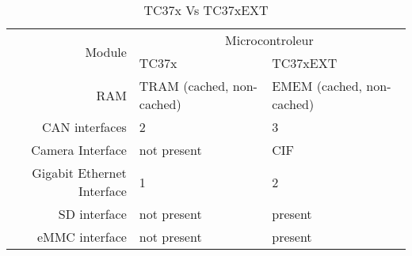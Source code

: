 
\begin{table}[htbp]
  \centering
    \begin{tabular}{|r||l|l|}
	\hline
	\multirow{2}{*}{Module} & \multicolumn{2}{c|}{Microcontroleur}\\
	\cline{2-3}
	& TC37x & TC37xEXT \\
	\hline \hline
	    RAM & TRAM (cached, non-cached) & EMEM (cached, non-cached) \\
	    \hline
	    CAN interfaces & 2 & 3 \\
	    \hline
	    Camera Interface & not present & CIF \\
	    \hline
	    Gigabit Ethernet Interface & 1 & 2 \\
	    \hline
	    SD interface & not present & present \\
	    \hline
	    eMMC interface & not present & present \\
	    \hline
	\hline
    \end{tabular}
  \caption{TC37x Vs TC37xEXT}
  \label{tab:tc37x_delta}
\end{table}

